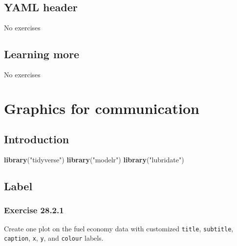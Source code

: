 \documentclass[]{book}
\newenvironment{Shaded}{\begin{snugshade}}{\end{snugshade}}
\newcommand{\KeywordTok}[1]{\textcolor[rgb]{0.13,0.29,0.53}{\textbf{#1}}}
\newcommand{\NormalTok}[1]{#1}
\newcommand{\StringTok}[1]{\textcolor[rgb]{0.31,0.60,0.02}{#1}}
\theoremstyle{plain}
\theoremstyle{remark}
\begin{document}
\hypertarget{yaml-header}{%
\section{YAML header}\label{yaml-header}}

No exercises

\hypertarget{learning-more-1}{%
\section{Learning more}\label{learning-more-1}}

No exercises

\hypertarget{graphics-for-communication}{%
\chapter{Graphics for communication}\label{graphics-for-communication}}

\hypertarget{introduction-18}{%
\section{Introduction}\label{introduction-18}}

\begin{Shaded}
\begin{Highlighting}[]
\KeywordTok{library}\NormalTok{(}\StringTok{"tidyverse"}\NormalTok{)}
\KeywordTok{library}\NormalTok{(}\StringTok{"modelr"}\NormalTok{)}
\KeywordTok{library}\NormalTok{(}\StringTok{"lubridate"}\NormalTok{)}
\end{Highlighting}
\end{Shaded}

\hypertarget{label}{%
\section{Label}\label{label}}

\hypertarget{exercise-28.2.1}{%
\subsection*{\texorpdfstring{Exercise
{28.2.1}}{Exercise 28.2.1}}\label{exercise-28.2.1}}

Create one plot on the fuel economy data with customized \texttt{title},
\texttt{subtitle}, \texttt{caption}, \texttt{x}, \texttt{y}, and
\texttt{colour} labels.
\end{document}

